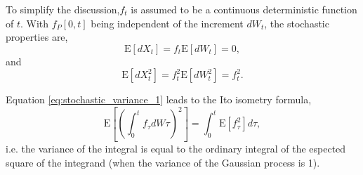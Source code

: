 \documentclass[letterpaper%
, twoside%
, 12pt%
,memoire%
, english%
,creativecommons,hyperref%
]{thETS}
\begin{document}
To simplify the discussion,$f_t$ is assumed to be a continuous deterministic function of $t$. With $f_P{[0,t]}$ being independent of the increment $dW_t$, the stochastic properties are, 
\begin{equation}
\text{E}[dX_t] = f_t\text{E}[dW_t] = 0,
\end{equation}
and
\begin{equation} \label{eq:stochastic_variance_1}
\text{E}[dX_t^2] = f_t^2\text{E}[dW_t^2]=f_t^2.
\end{equation}

Equation \ref{eq:stochastic_variance_1} leads to the Ito isometry formula, 
\begin{equation} \label{eq:ito_isometry}
\text{E}\left[\left( \int_0^t f_\tau dW\tau   \right)^2\right] = \int_0^t \text{E}\left[ f_\tau^2\right] d\tau ,
\end{equation}
i.e. the variance of the integral is equal to the ordinary integral of the espected square of the integrand (when the variance of the Gaussian process is 1). 
\end{document}
